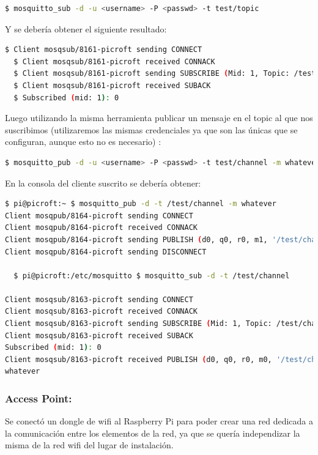 \begin{lstlisting}[language=bash]
  $ mosquitto_sub -d -u <username> -P <passwd> -t test/topic
\end{lstlisting}

Y se debería obtener el siguiente resultado:

\begin{lstlisting}[language=bash]
  $ Client mosqsub/8161-picroft sending CONNECT
  $ Client mosqsub/8161-picroft received CONNACK
  $ Client mosqsub/8161-picroft sending SUBSCRIBE (Mid: 1, Topic: /test/topic, QoS: 0)
  $ Client mosqsub/8161-picroft received SUBACK
  $ Subscribed (mid: 1): 0
\end{lstlisting}

Luego utilizando la misma herramienta publicar un mensaje en el topic al que nos suscribimos (utilizaremos las mismas credenciales ya que son las únicas que se configuran, aunque esto no es necesario) :

\begin{lstlisting}[language=bash]
  $ mosquitto_pub -d -u <username> -P <passwd> -t test/channel -m whatever
\end{lstlisting}

En la consola del cliente suscrito se debería obtener:

\begin{lstlisting}[language=bash]
  $ pi@picroft:~ $ mosquitto_pub -d -t /test/channel -m whatever
Client mosqpub/8164-picroft sending CONNECT
Client mosqpub/8164-picroft received CONNACK
Client mosqpub/8164-picroft sending PUBLISH (d0, q0, r0, m1, '/test/channel', ... (8 bytes))
Client mosqpub/8164-picroft sending DISCONNECT

  $ pi@picroft:/etc/mosquitto $ mosquitto_sub -d -t /test/channel

Client mosqsub/8163-picroft sending CONNECT
Client mosqsub/8163-picroft received CONNACK
Client mosqsub/8163-picroft sending SUBSCRIBE (Mid: 1, Topic: /test/channel, QoS: 0)
Client mosqsub/8163-picroft received SUBACK
Subscribed (mid: 1): 0
Client mosqsub/8163-picroft received PUBLISH (d0, q0, r0, m0, '/test/channel', ... (8 bytes))
whatever
\end{lstlisting}

\subsubsection{Access Point:}

Se conectó un dongle de wifi al Raspberry Pi para poder crear una red dedicada a la comunicación entre los elementos de la red, ya que se quería independizar la misma de la red wifi del lugar de instalación.~\cite{AccessPoint}

